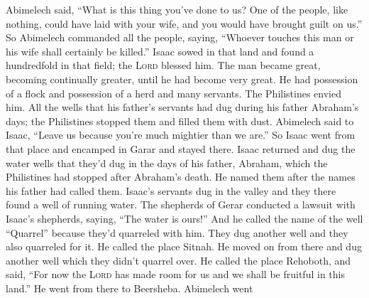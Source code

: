 \begin{inparaenum}
     Abimelech said, ``What is this thing you've done to us? One of the people, like nothing, could have laid with your wife, and you would have brought guilt on us.''%
     So Abimelech commanded all the people, saying, ``Whoever touches this man or his wife shall certainly be killed.''%
     Isaac sowed in that land and found a hundredfold in that field; the \textsc{Lord} blessed him.%
     The man became great, becoming continually greater, until he had become very great.%
     He had possession of a flock and possession of a herd and many servants. The Philistines envied him.%
     All the wells that his father's servants had dug during his father Abraham's days; the Philistines stopped them and filled them with dust.%
     Abimelech said to Isaac, ``Leave us because you're much mightier than we are.''%
     So Isaac went from that place and encamped in Garar and stayed there.%
     Isaac returned and dug the water wells that they'd dug in the days of his father, Abraham, which the Philistines had stopped after Abraham's death. He named them after the names his father had called them.%
     Isaac's servants dug in the valley and they there found a well of running water.%
     The shepherds of Gerar conducted a lawsuit with Isaac's shepherds, saying, ``The water is ours!'' And he called the name of the well ``Quarrel'' because they'd quarreled with him.%
     They dug another well and they also quarreled for it. He called the place Sitnah.%
     He moved on from there and dug another well which they didn't quarrel over. He called the place Rehoboth, and said, ``For now the \textsc{Lord} has made room for us and we shall be fruitful in this land.''%
     He went from there to Beersheba.%
     Abimelech went %
    
\end{inparaenum}
